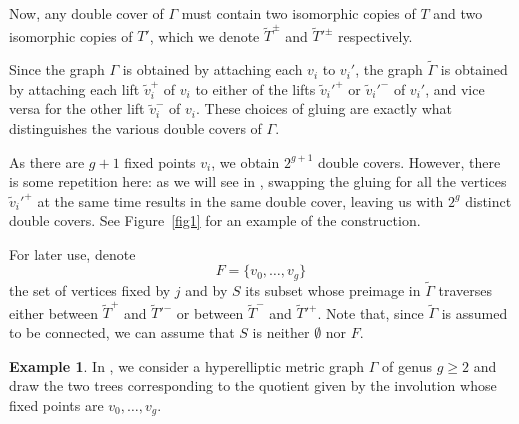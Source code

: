 \documentclass[11pt]{article}
\theoremstyle{definition}
\newtheorem{exam}[theo]{Example}
\numberwithin{equation}{section}
\theoremstyle{definition}
\newcommand{\Ga}{\Gamma}
\newcommand{\wt}[1]{\widetilde{#1}}
\begin{document}
{Now, any double cover of $\Gamma$ must contain two isomorphic copies of $T$ and two isomorphic copies of $T'$, which we denote  $\wt T^{\pm}$ and $\wt T'^{\pm}$ respectively. 

Since the graph $\Gamma$ is obtained by attaching each  $v_i$ to $v_i'$, the graph $\wt\Gamma$ is obtained by attaching each lift $\wt v_i^+$ of $v_i$ to either of the lifts $\wt v_i'^+$ or  $\wt v_i'^-$ of $v_i'$, and vice versa for the other lift $\wt v_i^-$ of $v_i$. These choices of gluing  are exactly what distinguishes the various double covers of $\Gamma$. 


As there are $g+1$ fixed points $v_i$, we obtain $2^{g+1}$ double covers. However, there is some repetition here: as we will see in ,
swapping the gluing for all the vertices $\wt v_i'^+$ at the same time results in the same double cover, leaving us with $2^g$ distinct double covers.  
 See Figure~\ref{fig1} for an example of the construction.
 
For later use, denote 
\begin{equation}
   F=\{v_0,\ldots, v_g\}
\end{equation}
the set of vertices fixed by $j$ and by $S$ its subset whose preimage in $\wt\Gamma$ traverses either between $\wt T^{+}$ and $\wt T'^{-}$ or between $\wt T^{-}$ and $\wt T'^{+}$. Note that, since $\wt\Gamma$ is assumed to be connected, we can assume that $S$ is neither $\emptyset$ nor $F$. 

\begin{exam}
In , we consider a hyperelliptic metric graph $\Ga$ of genus $g\geq 2$ and draw the two trees corresponding to the quotient given by the involution whose fixed points are $v_0,\dots,v_g$. 

\begin{figure}[ht]
\centering


\end{figure}
\end{exam}}
\end{document}

